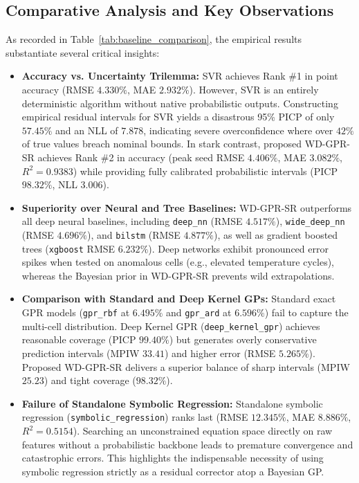 \documentclass[a4paper,fleqn]{cas-sc}
\begin{document}
\subsection{Comparative Analysis and Key Observations}
As recorded in Table~\ref{tab:baseline_comparison}, the empirical results substantiate several critical insights:
\begin{itemize}
    \item \textbf{Accuracy vs. Uncertainty Trilemma:} SVR achieves Rank \#1 in point accuracy (RMSE $4.330\%$, MAE $2.932\%$). However, SVR is an entirely deterministic algorithm without native probabilistic outputs. Constructing empirical residual intervals for SVR yields a disastrous 95\% PICP of only $57.45\%$ and an NLL of $7.878$, indicating severe overconfidence where over $42\%$ of true values breach nominal bounds. In stark contrast, proposed WD-GPR-SR achieves Rank \#2 in accuracy (peak seed RMSE $4.406\%$, MAE $3.082\%$, $R^2 = 0.9383$) while providing fully calibrated probabilistic intervals (PICP $98.32\%$, NLL $3.006$).
    \item \textbf{Superiority over Neural and Tree Baselines:} WD-GPR-SR outperforms all deep neural baselines, including \texttt{deep\_nn} (RMSE $4.517\%$), \texttt{wide\_deep\_nn} (RMSE $4.696\%$), and \texttt{bilstm} (RMSE $4.877\%$), as well as gradient boosted trees (\texttt{xgboost} RMSE $6.232\%$). Deep networks exhibit pronounced error spikes when tested on anomalous cells (e.g., elevated temperature cycles), whereas the Bayesian prior in WD-GPR-SR prevents wild extrapolations.
    \item \textbf{Comparison with Standard and Deep Kernel GPs:} Standard exact GPR models (\texttt{gpr\_rbf} at $6.495\%$ and \texttt{gpr\_ard} at $6.596\%$) fail to capture the multi-cell distribution. Deep Kernel GPR (\texttt{deep\_kernel\_gpr}) achieves reasonable coverage (PICP $99.40\%$) but generates overly conservative prediction intervals (MPIW $33.41$) and higher error (RMSE $5.265\%$). Proposed WD-GPR-SR delivers a superior balance of sharp intervals (MPIW $25.23$) and tight coverage ($98.32\%$).
    \item \textbf{Failure of Standalone Symbolic Regression:} Standalone symbolic regression (\texttt{symbolic\_regression}) ranks last (RMSE $12.345\%$, MAE $8.886\%$, $R^2 = 0.5154$). Searching an unconstrained equation space directly on raw features without a probabilistic backbone leads to premature convergence and catastrophic errors. This highlights the indispensable necessity of using symbolic regression strictly as a residual corrector atop a Bayesian GP.
\end{itemize}
\end{document}
